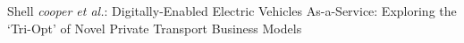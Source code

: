 \documentclass[journal]{IEEEtran}
\begin{document}
%
{Shell \MakeLowercase{\textit{Cooper et al.}}: Digitally-Enabled
  Electric Vehicles As-a-Service: Exploring the `Tri-Opt' of Novel
  Private Transport Business Models}
% 




\maketitle




\end{document}
